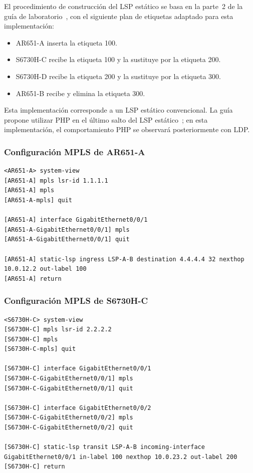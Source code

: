 El procedimiento de construcción del LSP estático se basa en la parte~2 de
la guía de laboratorio~\cite[parte~2]{guia-mpls-ar651-s6730h}, con el siguiente
plan de etiquetas adaptado para esta implementación:

\begin{itemize}
    \item AR651-A inserta la etiqueta 100.
    \item S6730H-C recibe la etiqueta 100 y la sustituye por la etiqueta 200.
    \item S6730H-D recibe la etiqueta 200 y la sustituye por la etiqueta 300.
    \item AR651-B recibe y elimina la etiqueta 300.
\end{itemize}

Esta implementación corresponde a un LSP estático convencional. La guía
propone utilizar PHP en el último salto del LSP estático~\cite[tarea~2.3]{guia-mpls-ar651-s6730h};
en esta implementación, el comportamiento PHP se observará posteriormente con LDP.

\subsubsection{Configuración MPLS de AR651-A}

\begin{lstlisting}[style=terminal]
<AR651-A> system-view
[AR651-A] mpls lsr-id 1.1.1.1
[AR651-A] mpls
[AR651-A-mpls] quit

[AR651-A] interface GigabitEthernet0/0/1
[AR651-A-GigabitEthernet0/0/1] mpls
[AR651-A-GigabitEthernet0/0/1] quit

[AR651-A] static-lsp ingress LSP-A-B destination 4.4.4.4 32 nexthop 10.0.12.2 out-label 100
[AR651-A] return
\end{lstlisting}

\subsubsection{Configuración MPLS de S6730H-C}

\begin{lstlisting}[style=terminal]
<S6730H-C> system-view
[S6730H-C] mpls lsr-id 2.2.2.2
[S6730H-C] mpls
[S6730H-C-mpls] quit

[S6730H-C] interface GigabitEthernet0/0/1
[S6730H-C-GigabitEthernet0/0/1] mpls
[S6730H-C-GigabitEthernet0/0/1] quit

[S6730H-C] interface GigabitEthernet0/0/2
[S6730H-C-GigabitEthernet0/0/2] mpls
[S6730H-C-GigabitEthernet0/0/2] quit

[S6730H-C] static-lsp transit LSP-A-B incoming-interface GigabitEthernet0/0/1 in-label 100 nexthop 10.0.23.2 out-label 200
[S6730H-C] return
\end{lstlisting}

